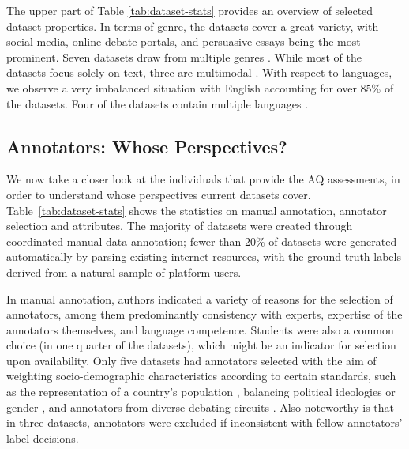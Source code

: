 The upper part of Table \ref{tab:dataset-stats} provides an overview of selected dataset properties. In terms of genre, the datasets cover a great variety, with social media, online debate portals, and persuasive essays being the most prominent. Seven datasets draw from multiple genres \cite{xu2014identifying, napoles-etal-2017-finding, lauscher-etal-2020-rhetoric, ziegenbein-etal-2023-modeling, falk-lapesa-2023-storyarg, helwe-etal-2024-mafalda, li-etal-2024-side}. While most of the datasets focus solely on text, three are multimodal \cite{liu-etal-2022-imagearg, liu-etal-2023-overview, mancini-etal-2024-multimodal}. With respect to languages, we observe a very imbalanced situation with English accounting for over 85\% of the datasets. Four of the datasets contain multiple languages \cite{Gerber_Baechtiger_Shikano_Reber_Rohr_2018, toledo-ronen-etal-2020-multilingual, falk-lapesa-2022-scaling, reveilhac2023comparing}.


\subsection{Annotators: Whose Perspectives?}
\label{sec:perceptions}

We now take a closer look at the individuals that provide the AQ assessments, in order to understand whose perspectives current datasets cover. Table~\ref{tab:dataset-stats} shows the statistics on manual annotation, annotator selection and attributes. The majority of datasets were created through coordinated manual data annotation; fewer than 20\% of datasets were generated automatically by parsing existing internet resources, with the ground truth labels derived from a natural sample of platform users.

In manual annotation, authors indicated a variety of reasons for the selection of annotators, among them predominantly consistency with experts, expertise of the annotators themselves, and language competence. Students were also a common choice (in one quarter of the datasets), which might be an indicator for selection upon availability. Only five datasets had annotators selected with the aim of weighting socio-demographic characteristics according to certain standards, such as the representation of a country's population \cite{lukin-etal-2017-argument, brenneis-etal-2021-will}, balancing political ideologies or gender \cite{el-baff-etal-2018-challenge, falk-etal-2024-moderation}, and annotators from diverse debating circuits  \cite{joshi-etal-2023-arganalysis35k}. Also noteworthy is that in three datasets, annotators were excluded if inconsistent with fellow annotators' label decisions.

